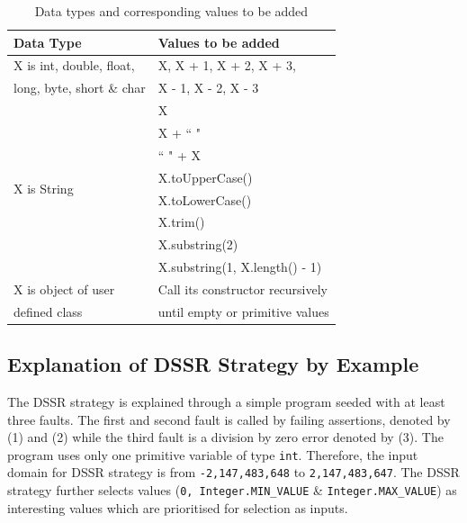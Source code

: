 \begin{table}[H]
\caption{Data types and corresponding values to be added} %
\centering %
{\renewcommand{\arraystretch}{1} 
\begin{tabular}{| l | l |} %
\hline\hline %
Data Type & Values to be added\\ [0.5ex] %
\hline %
\multirow{1}{*}{X is int, double, float, } & X,  X + 1, X + 2, X + 3,  \\ %
\multirow{1}{*}{long, byte, short \& char} & X - 1, X - 2, X - 3 \\ 

\hline
\multirow{8}{*}{X is String} & X\\ %

& X + ``  "\\ %
& ``  " + X \\ %
& X.toUpperCase() \\
& X.toLowerCase() \\
& X.trim() \\
& X.substring(2) \\
& X.substring(1, X.length() - 1) \\
\hline
\multirow{1}{*}{X is object of user} & Call its constructor recursively \\ %
\multirow{1}{*}{defined class} & until empty or primitive values \\[1ex]
\hline
\hline %
\end{tabular}
}
\label{table:addvalues2} %
\end{table}



\newpage
\subsection{Explanation of DSSR Strategy by Example}
The DSSR strategy is explained through a simple program seeded with at least three faults. The first and second fault is called by failing assertions, denoted by (1) and (2) while the third fault is a division by zero error denoted by (3). The program uses only one primitive variable of type \verb+int+. Therefore, the input domain for DSSR strategy is from \verb+-2,147,483,648+ to \verb+2,147,483,647+. The DSSR strategy further selects values (\verb+0, Integer.MIN_VALUE+ \& \verb+Integer.MAX_VALUE+) as interesting values which are prioritised for selection as inputs. 

